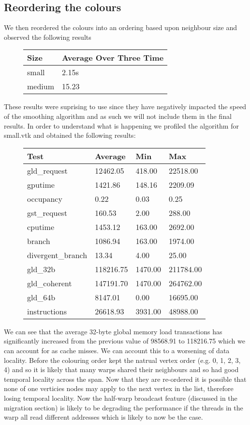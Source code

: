 \subsection*{Reordering the colours}
We then reordered the colours into an ordering based upon neighbour size and observed the following results\\
\begin{figure}[H]\centering \begin{tabular}{ l | l }
  \hline
  Size & Average Over Three Time \\
  \hline
  \hline
  small & 2.15s \\
  medium & 15.23 \\
  \hline
\end{tabular} \end{figure}

These results were suprising to use since they have negatively impacted the speed of the smoothing algorithm and as such we will not include them in the final results. In order to understand what is happening we profiled the algorithm for small.vtk and obtained the following results:\\

\begin{figure}[H]\centering \begin{tabular}{ l | l | l | l}
\hline
Test & Average & Min & Max \\
\hline
\hline
gld\_request & 12462.05 & 418.00 & 22518.00 \\
gputime & 1421.86 & 148.16 & 2209.09 \\
occupancy & 0.22 & 0.03 & 0.25 \\
gst\_request & 160.53 & 2.00 & 288.00 \\
cputime & 1453.12 & 163.00 & 2692.00 \\
branch & 1086.94 & 163.00 & 1974.00 \\
divergent\_branch & 13.34 & 4.00 & 25.00 \\
gld\_32b & 118216.75 & 1470.00 & 211784.00 \\
gld\_coherent & 147191.70 & 1470.00 & 264762.00 \\
gld\_64b & 8147.01 & 0.00 & 16695.00 \\
instructions & 26618.93 & 3931.00 & 48988.00 \\
\hline
\end{tabular} \end{figure}

We can see that the average 32-byte global memory load transactions has significantly increased from the previous value of 98568.91 to 118216.75 which we can account for as cache misses. We can account this to a worsening of data locality. Before the colouring order kept the natrual vertex order (e.g. 0, 1, 2, 3, 4) and so it is likely that many warps shared their neighbours and so had good temporal locality across the span.
Now that they are re-ordered it is possible that none of one verticies nodes may apply to the next vertex in the list, therefore losing temporal locality.
Now the half-warp broadcast feature (discussed in the migration section) is likely to be degrading the performance if the
threads in the warp all read different addresses which is likely to now be the case.
